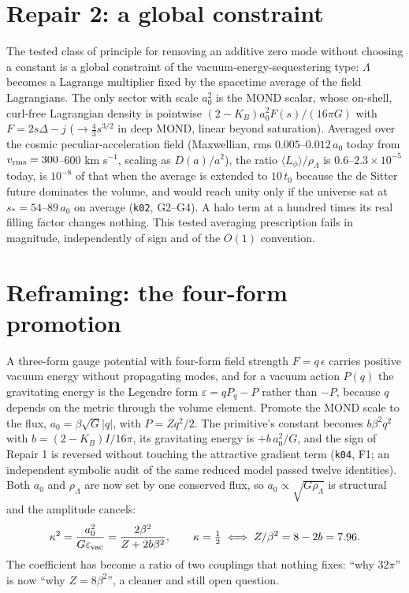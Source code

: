 \documentclass[11pt,letterpaper]{article}
\begin{document}
\section{Repair 2: a global constraint}
The tested class of principle for removing an additive zero mode without choosing a constant is a global constraint of the vacuum-energy-sequestering type: $\Lambda$ becomes a Lagrange multiplier fixed by the spacetime average of the field Lagrangians. The only sector with scale $a_0^2$ is the MOND scalar, whose on-shell, curl-free Lagrangian density is pointwise $(2-K_B)a_0^2F(s)/(16\pi G)$ with $F=2s\Delta-j$ ($\to\tfrac43s^{3/2}$ in deep MOND, linear beyond saturation). Averaged over the cosmic peculiar-acceleration field (Maxwellian, rms $0.005$--$0.012\,a_0$ today from $v_{\rm rms}=300$--$600$ km s$^{-1}$, scaling as $D(a)/a^2$), the ratio $\langle L_\phi\rangle/\rho_\Lambda$ is $0.6$--$2.3\times10^{-5}$ today, is $10^{-8}$ of that when the average is extended to $10\,t_0$ because the de Sitter future dominates the volume, and would reach unity only if the universe sat at $s_*=54$--$89\,a_0$ on average (\texttt{k02}, G2--G4). A halo term at a hundred times its real filling factor changes nothing. This tested averaging prescription fails in magnitude, independently of sign and of the $O(1)$ convention.

\section{Reframing: the four-form promotion}\label{sec:fourform}
A three-form gauge potential with four-form field strength $F=q\,\epsilon$ carries positive vacuum energy without propagating modes, and for a vacuum action $P(q)$ the gravitating energy is the Legendre form $\varepsilon=qP_q-P$ rather than $-P$, because $q$ depends on the metric through the volume element. Promote the MOND scale to the flux, $a_0=\beta\sqrt G|q|$, with $P=Zq^2/2$. The primitive's constant becomes $b\beta^2q^2$ with $b=(2-K_B)I/16\pi$, its gravitating energy is $+b\,a_0^2/G$, and the sign of Repair 1 is reversed without touching the attractive gradient term (\texttt{k04}, F1; an independent symbolic audit of the same reduced model passed twelve identities). Both $a_0$ and $\rho_\Lambda$ are now set by one conserved flux, so $a_0\propto\sqrt{G\rho_\Lambda}$ is structural and the amplitude cancels:
\begin{equation}
\kappa^2=\frac{a_0^2}{G\varepsilon_{\rm vac}}=\frac{2\beta^2}{Z+2b\beta^2},\qquad \kappa=\tfrac12\iff Z/\beta^2=8-2b=7.96 .
\end{equation}
The coefficient has become a ratio of two couplings that nothing fixes: ``why $32\pi$'' is now ``why $Z=8\beta^2$'', a cleaner and still open question.
\end{document}
